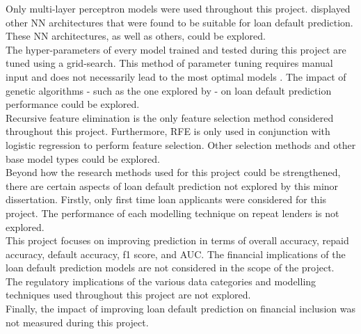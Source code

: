 Only multi-layer perceptron models were used throughout this project. \textcite{NNWest} displayed other NN architectures that were found to be suitable for loan default prediction. These NN architectures, as well as others, could be explored. \\

The hyper-parameters of every model trained and tested during this project are tuned using a grid-search. This method of parameter tuning requires manual input and does not necessarily lead to the most optimal models \parencite{NNWest}. The impact of genetic algorithms - such as the one explored by \textcite{NNShen} - on loan default prediction performance could be explored. \\

Recursive feature elimination is the only feature selection method considered throughout this project. Furthermore, RFE is only used in conjunction with logistic regression to perform feature selection. Other selection methods and other base model types could be explored. \\  

Beyond how the research methods used for this project could be strengthened, there are certain aspects of loan default prediction not explored by this minor dissertation. Firstly, only first time loan applicants were considered for this project. The performance of each modelling technique on repeat lenders is not explored. \\

This project focuses on improving prediction in terms of overall accuracy, repaid accuracy, default accuracy, f1 score, and AUC. The financial implications of the loan default prediction models are not considered in the scope of the project. \\

The regulatory implications of the various data categories and modelling techniques used throughout this project are not explored. \\

Finally, the impact of improving loan default prediction on financial inclusion was not measured during this project. 
